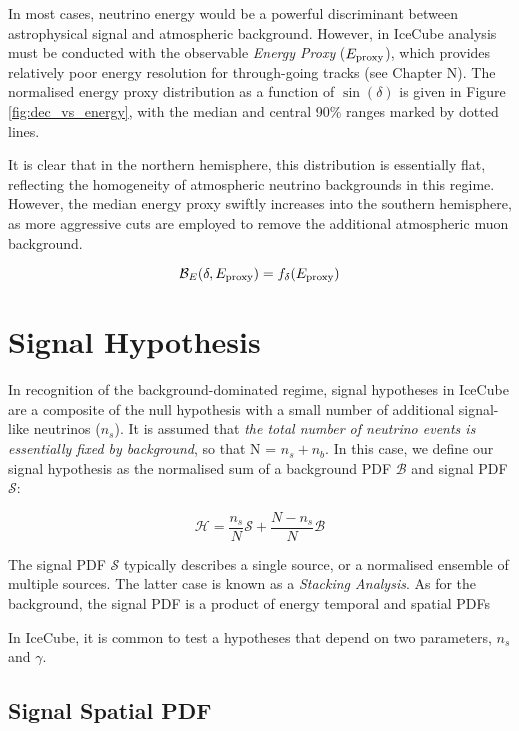 In most cases, neutrino energy would be a powerful discriminant between astrophysical signal and atmospheric background. However, in IceCube analysis must be conducted with the observable \emph{Energy Proxy}  ($E_{\textup{proxy}}$), which provides relatively poor energy resolution for through-going tracks (see Chapter N). The normalised energy proxy distribution as a function of $\sin(\delta)$ is given in Figure \ref{fig:dec_vs_energy}, with the median and central 90\% ranges marked by dotted lines. 

It is clear that in the northern hemisphere, this distribution is essentially flat, reflecting the homogeneity of atmospheric neutrino backgrounds in this regime. However, the median energy proxy swiftly increases into the southern hemisphere, as more aggressive cuts are employed to remove the additional atmospheric muon background.

\begin{equation}
\mathcal{B}_{E} (\delta, E_{\textup{proxy}}) = f_{\delta}(E_{\textup{proxy}})
\end{equation}

\section{Signal Hypothesis}

In recognition of the background-dominated regime, signal hypotheses in IceCube are a composite of the null hypothesis with a small number of additional signal-like neutrinos ($n_{s}$). It is assumed that \emph{the total number of neutrino events is essentially fixed by background}, so that N = $n_{s} + n_{b}$. In this case, we define our signal hypothesis as the normalised sum of a background PDF $\mathcal{B}$ and signal PDF $\mathcal{S}$:

\[ \mathcal{H}= \frac{n_{s}}{N} \mathcal{S} + \frac{N - n_{s}}{N} \mathcal{B}  \]

The signal PDF $\mathcal{S}$ typically describes a single source, or a normalised ensemble of multiple sources. The latter case is known as a \emph{Stacking Analysis}. As for the background, the signal PDF is a product of energy temporal and spatial PDFs

In IceCube, it is common to test a hypotheses that depend on two parameters, $n_{s}$ and $\gamma$. 

\subsection{Signal Spatial PDF}

